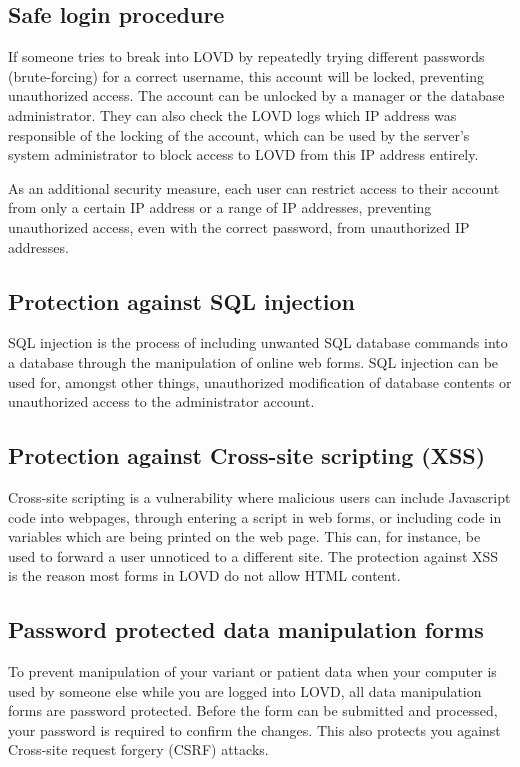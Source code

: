 \subsection{Safe login procedure}
If someone tries to break into LOVD by repeatedly trying different passwords (brute-forcing) for a correct username, this account will be locked, preventing unauthorized access.
The account can be unlocked by a manager or the database administrator.
They can also check the LOVD logs which IP address was responsible of the locking of the account, which can be used by the server's system administrator to block access to LOVD from this IP address entirely.

As an additional security measure, each user can restrict access to their account from only a certain IP address or a range of IP addresses, preventing unauthorized access, even with the correct password, from unauthorized IP addresses.



\subsection{Protection against SQL injection}
SQL injection is the process of including unwanted SQL database commands into a database through the manipulation of online web forms.
SQL injection can be used for, amongst other things, unauthorized modification of database contents or unauthorized access to the administrator account.



\subsection{Protection against Cross-site scripting (XSS)}
Cross-site scripting is a vulnerability where malicious users can include Javascript code into webpages,
 through entering a script in web forms, or including code in variables which are being printed on the web page.
This can, for instance, be used to forward a user unnoticed to a different site.
The protection against XSS is the reason most forms in LOVD do not allow HTML content.



\subsection{Password protected data manipulation forms}
To prevent manipulation of your variant or patient data when your computer is used by someone else while you are logged into LOVD, all data manipulation forms are password protected.
Before the form can be submitted and processed, your password is required to confirm the changes.
This also protects you against Cross-site request forgery (CSRF) attacks.





